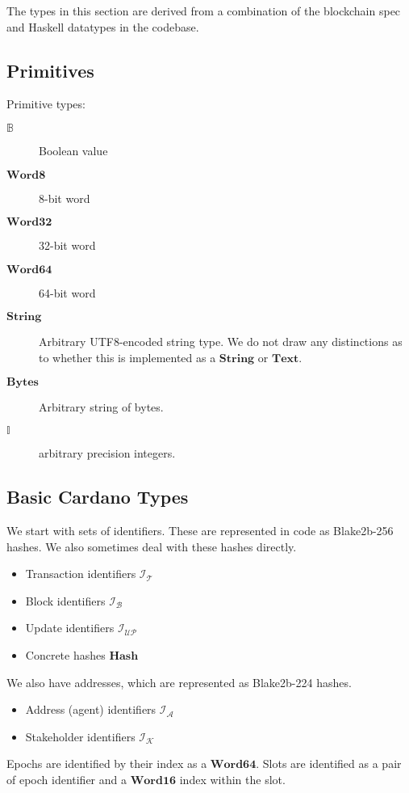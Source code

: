 \documentclass{article}
\newcommand{\idsof}[1]{\mathcal{I}\!_#1}
\newcommand{\txids}{\idsof{\txs}}
\newcommand{\blockids}{\idsof{\blocks}}
\newcommand{\agentids}{\idsof{\agents}}
\newcommand{\updids}{\idsof{\mathcal{UP}}}
\newcommand{\stakeholderids}{\idsof{\mathcal{K}}}
\newcommand{\agents}{\mathcal{A}}
\newcommand{\txs}{\mathcal{T}}
\newcommand{\blocks}{\mathcal{B}}
\newcommand{\hstype}[1]{\textbf{#1}}
\newcommand{\String}{\hstype{String}}
\newcommand{\Word}[1]{\hstype{Word#1}}
\newcommand{\hash}{\hstype{Hash}}
\newcommand{\Integer}{\mathbb{I}}
\newcommand{\Bool}{\mathbb{B}}
\newcommand{\Bytes}{\hstype{Bytes}}
\begin{document}
The types in this section are derived from a combination of the blockchain spec
and Haskell datatypes in the codebase.

\subsection{Primitives}

Primitive types:

\begin{description}
\item [$\Bool$] Boolean value
\item [$\Word{8}$] 8-bit word
\item [$\Word{32}$] 32-bit word
\item [$\Word{64}$] 64-bit word
\item [$\String$] Arbitrary UTF8-encoded string type. We do not draw any
  distinctions as to whether this is implemented as a $\hstype{String}$ or
  $\hstype{Text}$.
\item [$\Bytes$] Arbitrary string of bytes.
\item [$\Integer$] arbitrary precision integers.
\end{description}

\subsection{Basic Cardano Types}

We start with sets of identifiers. These are represented in code as Blake2b-256
hashes. We also sometimes deal with these hashes directly.

\begin{itemize}
\item{Transaction identifiers $\txids$}
\item{Block identifiers $\blockids$}
\item Update identifiers $\updids$
\item Concrete hashes $\hash$
\end{itemize}

We also have addresses, which are represented as Blake2b-224 hashes.

\begin{itemize}
\item{Address (agent) identifiers $\agentids$}
\item Stakeholder identifiers $\stakeholderids$
\end{itemize}

Epochs are identified by their index as a $\Word{64}$. Slots are identified as a
pair of epoch identifier and a $\Word{16}$ index within the slot.
\end{document}
